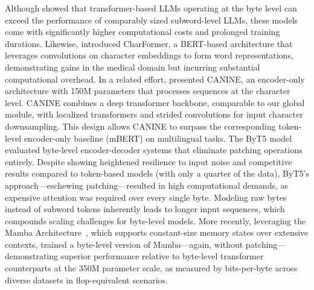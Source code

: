Although \cite{Choe2019BridgingTG} showed that transformer-based LLMs operating at the byte level can exceed the performance of comparably sized subword-level LLMs, these models come with significantly higher computational costs and prolonged training durations. Likewise, \cite{el2020characterbert} introduced CharFormer, a BERT-based architecture that leverages convolutions on character embeddings to form word representations, demonstrating gains in the medical domain but incurring substantial computational overhead. In a related effort, \cite{clark2022canine} presented CANINE, an encoder-only architecture with 150M parameters that processes sequences at the character level. CANINE combines a deep transformer backbone, comparable to our global module, with localized transformers and strided convolutions for input character downsampling. This design allows CANINE to surpass the corresponding token-level encoder-only baseline (mBERT) on multilingual tasks. The ByT5 model~\citep{xue2022byt5} evaluated byte-level encoder-decoder systems that eliminate patching operations entirely. Despite showing heightened resilience to input noise and competitive results compared to token-based models (with only a quarter of the data), ByT5’s approach—eschewing patching—resulted in high computational demands, as expensive attention was required over every single byte. Modeling raw bytes instead of subword tokens inherently leads to longer input sequences, which compounds scaling challenges for byte-level models. More recently, leveraging the Mamba Architecture~\citep{gu2023mamba}, which supports constant-size memory states over extensive contexts, \cite{wang2024mambabyte} trained a byte-level version of Mamba—again, without patching—demonstrating superior performance relative to byte-level transformer counterparts at the 350M parameter scale, as measured by bits-per-byte across diverse datasets in flop-equivalent scenarios.

